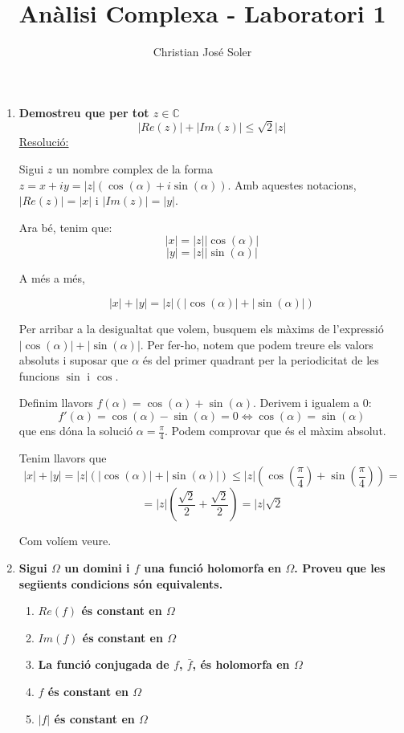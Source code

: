 \documentclass[10pt,a4paper]{article}
\author{Christian José Soler}
\title{Anàlisi Complexa - Laboratori 1}
\begin{document}
\maketitle

\begin{enumerate}
\item \textbf{Demostreu que per tot $z\in\mathbb{C}$
$$|Re(z)|+|Im(z)|\leq\sqrt{2}|z|$$}
\underline{Resolució:}

Sigui $z$ un nombre complex de la forma $z=x+iy=|z|(\cos(\alpha)+i\sin(\alpha))$. Amb aquestes notacions, $|Re(z)|=|x|$ i $|Im(z)|=|y|$.

Ara bé, tenim que:
$$|x| = |z||\cos(\alpha)|$$
$$|y| = |z||\sin(\alpha)|$$

A més a més,

$$|x|+|y| = |z|(|\cos(\alpha)| + |\sin(\alpha)|)$$

Per arribar a la desigualtat que volem, busquem els màxims de l'expressió $|\cos(\alpha)| + |\sin(\alpha)|$. Per fer-ho, notem que podem treure els valors absoluts i suposar que $\alpha$ és del primer quadrant per la periodicitat de les funcions $\sin$ i $\cos$.

Definim llavors $f(\alpha)=\cos(\alpha) + \sin(\alpha)$. Derivem i igualem a 0:
$$f'(\alpha) = \cos(\alpha)-\sin(\alpha)=0 \Leftrightarrow \cos(\alpha)=\sin(\alpha)$$ que ens dóna la solució $\alpha=\frac{\pi}{4}$. Podem comprovar que és el màxim absolut.

Tenim llavors que $$|x|+|y| = \left|z\right|\left(\left|\cos\left(\alpha\right)\right| + \left|\sin\left(\alpha\right)\right|\right) \leq \left|z\right|\left(\cos\left(\frac{\pi}{4}\right) + \sin\left(\frac{\pi}{4}\right)\right) =$$ 
$$= |z|\left(\frac{\sqrt{2}}{2}+\frac{\sqrt{2}}{2}\right) = |z|\sqrt{2}$$

Com volíem veure.

\item \textbf{Sigui $\Omega$ un domini i $f$ una funció holomorfa en $\Omega$. Proveu que les següents condicions són equivalents.}

\begin{enumerate}
\item \textbf{$Re(f)$ és constant en $\Omega$}
\item \textbf{$Im(f)$ és constant en $\Omega$}
\item \textbf{La funció conjugada de $f$, $\bar{f}$, és holomorfa en $\Omega$}
\item \textbf{$f$ és constant en $\Omega$}
\item \textbf{$|f|$ és constant en $\Omega$}
\end{enumerate}


\end{enumerate}
\end{document}
